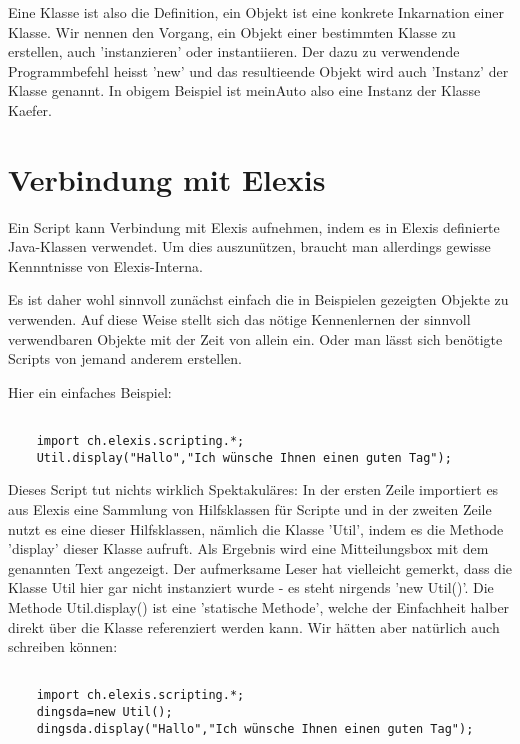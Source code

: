 \documentclass[a4paper]{scrartcl}
\begin{document}
\hrulefill

\medskip

Eine Klasse ist also die Definition, ein Objekt ist eine konkrete Inkarnation einer Klasse. Wir nennen den Vorgang, ein Objekt einer bestimmten Klasse zu erstellen, auch 'instanzieren' oder instantiieren. Der dazu zu verwendende Programmbefehl heisst 'new' und das resultieende Objekt wird auch 'Instanz' der Klasse genannt. In obigem Beispiel ist meinAuto also eine Instanz der Klasse Kaefer.

\section{Verbindung mit Elexis}
Ein Script kann Verbindung mit Elexis aufnehmen, indem es in Elexis definierte Java-Klassen
verwendet. Um dies auszunützen, braucht man allerdings gewisse Kennntnisse von Elexis-Interna.

Es ist daher wohl sinnvoll zunächst einfach die in Beispielen gezeigten Objekte zu verwenden.
Auf diese Weise stellt sich das nötige Kennenlernen der sinnvoll verwendbaren Objekte mit der
Zeit von allein ein. Oder man lässt sich benötigte Scripts von jemand anderem erstellen.

Hier ein einfaches Beispiel:

\begin{small}
\begin{verbatim}

    import ch.elexis.scripting.*;	
    Util.display("Hallo","Ich wünsche Ihnen einen guten Tag");

\end{verbatim}
\end{small}


Dieses Script tut nichts wirklich Spektakuläres: In der ersten Zeile importiert es aus Elexis eine Sammlung von Hilfsklassen für Scripte
und in der zweiten Zeile nutzt es eine dieser Hilfsklassen, nämlich die Klasse 'Util', indem es die Methode 'display' dieser Klasse
aufruft. Als Ergebnis wird eine Mitteilungsbox mit dem genannten Text angezeigt. Der aufmerksame Leser hat vielleicht gemerkt, dass die Klasse Util hier gar nicht instanziert wurde - es steht nirgends 'new Util()'. Die Methode Util.display() ist eine 'statische Methode', welche der Einfachheit halber direkt über die Klasse referenziert werden kann. Wir hätten aber natürlich auch schreiben können:

\begin{small}
\begin{verbatim}

    import ch.elexis.scripting.*;	
    dingsda=new Util();
    dingsda.display("Hallo","Ich wünsche Ihnen einen guten Tag");

\end{verbatim}
\end{small}
\end{document}
